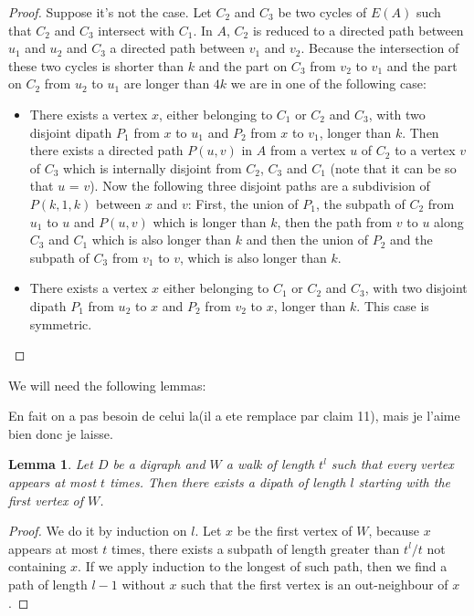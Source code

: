\documentclass[10pt]{article}
\theoremstyle{plain}
\newtheorem{lemma}[theorem]{Lemma}
\theoremstyle{definition}
\theoremstyle{remark}
\begin{document}
\begin{proof}

Suppose it's not the case. Let $C_2$ and $C_3$ be two cycles of $E(A)$ such that $C_2$ and $C_3$ intersect with $C_1$. 
In $A$, $C_2$ is reduced to a directed path between $u_1$ and $u_2$ and $C_3$ a directed path between $v_1$ and $v_2$.
Because the intersection of these two cycles is shorter than $k$ and the part on $C_3$ from $v_2$ to $v_1$ and the part
on $C_2$ from $u_2$ to $u_1$ are longer than $4k$ we are in one of the following case:
\begin{itemize}
	\item There exists a vertex $x$, either belonging to $C_1$ or $C_2$ and $C_3$, with two disjoint dipath $P_1$ from
	$x$ to $u_1$ and $P_2$ from $x$ to $v_1$, longer than $k$. Then there exists a directed path $P(u,v)$ in $A$ from 
	a vertex $u$ of $C_2$ to a vertex $v$ of $C_3$ which is internally disjoint from  $C_2$, $C_3$ and $C_1$ 
	(note that it can be so that $u$ = $v$). Now the following three disjoint paths are a subdivision of $P(k,1,k)$ between $x$ and $v$:
	First, the union of $P_1$, the subpath of $C_2$ from $u_1$ to $u$ and $P(u,v)$ which is longer than $k$, then the path from $v$ to $u$ 
	along $C_3$ and $C_1$ which is also longer than $k$ and then the union of $P_2$ and the subpath of $C_3$ from $v_1$ to $v$, which is also longer than $k$.
	\item There exists a vertex $x$ either belonging to $C_1$ or $C_2$ and $C_3$, with two disjoint dipath $P_1$ from
	$u_2$ to $x$ and $P_2$ from $v_2$ to $x$, longer than $k$. This case is symmetric. 
\end{itemize}

\end{proof}


We will need the following lemmas: 

En fait on a pas besoin de celui la(il a ete remplace par claim 11), mais je l'aime bien donc je laisse.
\begin{lemma}\label{walk}
Let $D$ be a digraph and $W$ a walk of length $t^l$ such that every vertex appears at most $t$ times.
Then there exists a dipath of length $l$ starting with the first vertex of $W$.
\end{lemma}

\begin{proof}
We do it by induction on $l$. Let $x$ be the first vertex of $W$, because $x$ appears at most $t$ times, there exists a subpath of length greater 
than $t^l/t$ not containing $x$. If we apply induction to the longest of such path, then we find a path of length $l-1$ without $x$ such that
 the first vertex is an out-neighbour of $x$.  

\end{proof}
\end{document}
